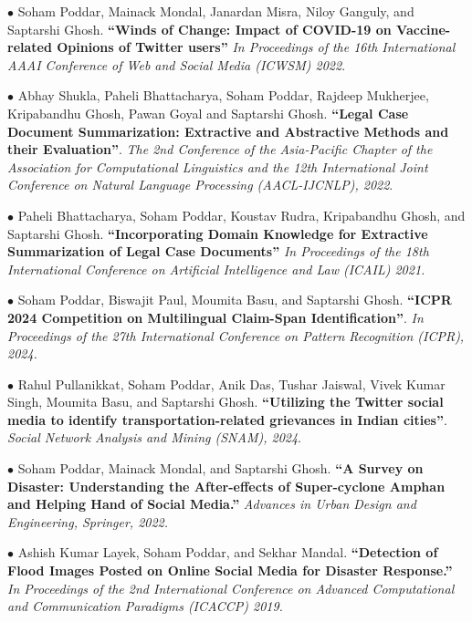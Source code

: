 \documentclass[paper=a4,fontsize=10pt]{scrartcl} %
\newcommand{\sepspace}{\vspace*{0.6em}}		%
\begin{document}
{    \noindent $\bullet$ Soham Poddar, Mainack Mondal, Janardan Misra, Niloy Ganguly, and Saptarshi Ghosh. \textbf{``Winds of Change: Impact of COVID-19 on Vaccine-related Opinions of Twitter users''} \textit{In Proceedings of the 16th International AAAI Conference of Web and Social Media (ICWSM) 2022}. \sepspace


    \noindent $\bullet$ Abhay Shukla, Paheli Bhattacharya, Soham Poddar, Rajdeep Mukherjee, Kripabandhu Ghosh, Pawan Goyal and Saptarshi Ghosh. \textbf{``Legal Case Document Summarization: Extractive and Abstractive Methods and their Evaluation''}. \textit{The 2nd Conference of the Asia-Pacific Chapter of the Association for Computational Linguistics and the 12th International Joint Conference on Natural Language Processing (AACL-IJCNLP), 2022}. \sepspace

    \noindent $\bullet$ Paheli Bhattacharya, Soham Poddar, Koustav Rudra, Kripabandhu Ghosh, and Saptarshi Ghosh. \textbf{``Incorporating Domain Knowledge for Extractive Summarization of Legal Case Documents''} \textit{In Proceedings of the 18th International Conference on Artificial Intelligence and Law (ICAIL) 2021.} \sepspace

    
    \noindent $\bullet$ Soham Poddar, Biswajit Paul, Moumita Basu, and Saptarshi Ghosh. \textbf{``ICPR 2024 Competition on Multilingual Claim-Span Identification''}.  
    \textit{In Proceedings of the 27th International Conference on Pattern Recognition (ICPR), 2024.} \sepspace

    
    \noindent $\bullet$ Rahul Pullanikkat, Soham Poddar, Anik Das, Tushar Jaiswal, Vivek Kumar Singh, Moumita Basu, and Saptarshi Ghosh. \textbf{``Utilizing the Twitter social media to identify transportation-related grievances in Indian cities''}. \textit{Social Network Analysis and Mining (SNAM), 2024}. 
    \vspace{1.5mm}
    
    \noindent $\bullet$  Soham Poddar, Mainack Mondal, and Saptarshi Ghosh. \textbf{``A Survey on Disaster: Understanding the After-effects of Super-cyclone Amphan and Helping Hand of Social Media.''} \textit{Advances in Urban Design and Engineering, Springer, 2022.} 
    \vspace{1.5mm}
    
    
    \noindent $\bullet$ Ashish Kumar Layek, Soham Poddar, and Sekhar Mandal. \textbf{``Detection of Flood Images Posted on Online Social Media for Disaster Response.''} \textit{In Proceedings of the 2nd International Conference on Advanced Computational and Communication Paradigms (ICACCP)  2019.} 
}
\vspace*{-1mm}
\end{document}
